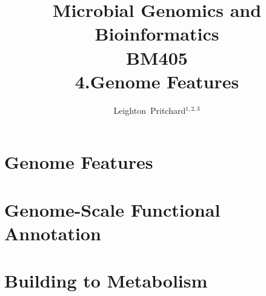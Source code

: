 



\title[Microbial Genomics and Bioinformatics: 4.Genome Features] %
{Microbial Genomics and \\ Bioinformatics \\
BM405 \\
4.Genome Features}
\author[Pritchard] %
{Leighton~Pritchard$^{1,2,3}$}
\subject{Bioinformatics, Genomics, Bacteria, Sequencing, Microbiology, Microbes}





\frame[plain]{\titlepage}



\section{Genome Features}





\section{Genome-Scale Functional Annotation}



\section{Building to Metabolism}


